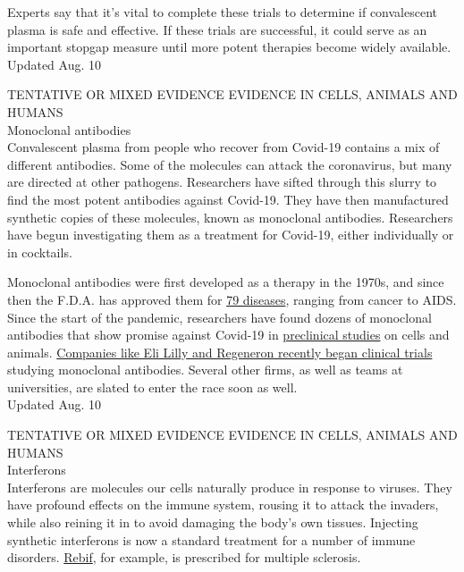 Experts say that it's vital to complete these trials to determine if
convalescent plasma is safe and effective. If these trials are
successful, it could serve as an important stopgap measure until more
potent therapies become widely available.\\
Updated Aug. 10

TENTATIVE OR MIXED EVIDENCE EVIDENCE IN CELLS, ANIMALS AND HUMANS\\
Monoclonal antibodies\\
Convalescent plasma from people who recover from Covid-19 contains a mix
of different antibodies. Some of the molecules can attack the
coronavirus, but many are directed at other pathogens. Researchers have
sifted through this slurry to find the most potent antibodies against
Covid-19. They have then manufactured synthetic copies of these
molecules, known as monoclonal antibodies. Researchers have begun
investigating them as a treatment for Covid-19, either individually or
in cocktails.

Monoclonal antibodies were first developed as a therapy in the 1970s,
and since then the F.D.A. has approved them for
\href{https://jbiomedsci.biomedcentral.com/articles/10.1186/s12929-019-0592-z}{79
diseases}, ranging from cancer to AIDS. Since the start of the pandemic,
researchers have found dozens of monoclonal antibodies that show promise
against Covid-19 in
\href{https://www.nytimes3xbfgragh.onion/reuters/2020/08/03/us/03reuters-health-coronavirus-regeneron.html}{preclinical
studies} on cells and animals.
\href{https://www.nytimes3xbfgragh.onion/2020/07/09/health/regeneron-monoclonal-antibodies.html}{Companies
like Eli Lilly and Regeneron recently began clinical trials} studying
monoclonal antibodies. Several other firms, as well as teams at
universities, are slated to enter the race soon as well.\\
Updated Aug. 10

TENTATIVE OR MIXED EVIDENCE EVIDENCE IN CELLS, ANIMALS AND HUMANS\\
Interferons\\
Interferons are molecules our cells naturally produce in response to
viruses. They have profound effects on the immune system, rousing it to
attack the invaders, while also reining it in to avoid damaging the
body's own tissues. Injecting synthetic interferons is now a standard
treatment for a number of immune disorders.
\href{https://www.nationalmssociety.org/Treating-MS/Medications/Rebif}{Rebif},
for example, is prescribed for multiple sclerosis.

